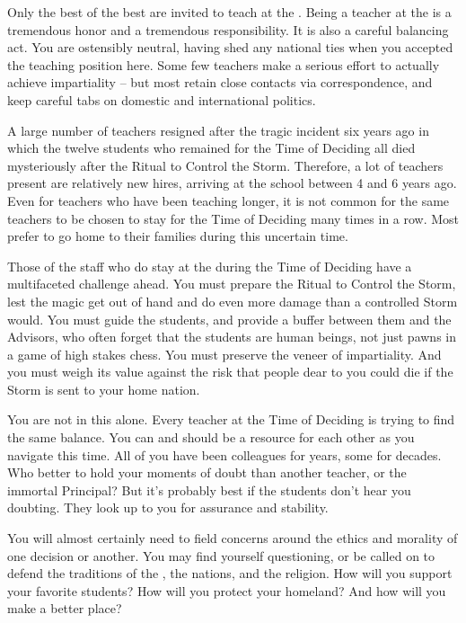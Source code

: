 \documentclass[blue]{GL2020}
\begin{document}
\name{\bTeacherBlue{}}

Only the best of the best are invited to teach at the \pSchool{}. Being a teacher at the \pSc{} is a tremendous honor and a tremendous responsibility. It is also a careful balancing act. You are ostensibly neutral, having shed any national ties when you accepted the teaching position here. Some few teachers make a serious effort to actually achieve impartiality -- but most retain close contacts via correspondence, and keep careful tabs on domestic and international politics.

A large number of teachers resigned after the tragic incident six years ago in which the twelve students who remained for the Time of Deciding all died mysteriously after the Ritual to Control the Storm. Therefore, a lot of teachers present are relatively new hires, arriving at the school between 4 and 6 years ago. Even for teachers who have been teaching longer, it is not common for the same teachers to be chosen to stay for the Time of Deciding many times in a row. Most prefer to go home to their families during this uncertain time.

Those of the staff who do stay at the \pSc{} during the Time of Deciding have a multifaceted challenge ahead. You must prepare the Ritual to Control the Storm, lest the magic get out of hand and do even more damage than a controlled Storm would. You must guide the students, and provide a buffer between them and the Advisors, who often forget that the students are human beings, not just pawns in a game of high stakes chess. You must preserve the veneer of impartiality. And you must weigh its value against the risk that people dear to you could die if the Storm is sent to your home nation.

You are not in this alone. Every teacher at the Time of Deciding is trying to find the same balance. You can and should be a resource for each other as you navigate this time. All of you have been colleagues for years, some for decades. Who better to hold your moments of doubt than another teacher, or the immortal Principal? But it's probably best if the students don't hear you doubting. They look up to you for assurance and stability.

You will almost certainly need to field concerns around the ethics and morality of one decision or another. You may find yourself questioning, or be called on to defend the traditions of the \pSc{}, the nations, and the religion. How will you support your favorite students? How will you protect your homeland? And how will you make \pEarth{} a better place?
\end{document}

